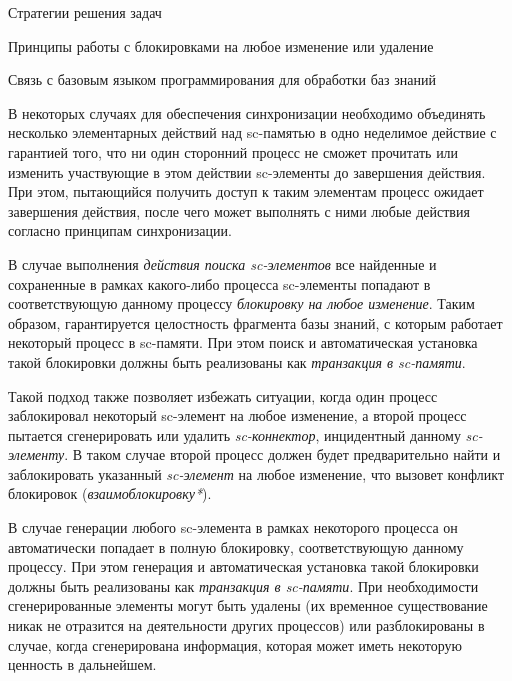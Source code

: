 \begin{frame}{Стратегии решения задач}
\begin{frame}{\large Принципы работы с блокировками на любое изменение или удаление}
\begin{frame}{Связь с базовым языком программирования для обработки баз
знаний}
\begin{frame}{}
В некоторых случаях для обеспечения синхронизации необходимо объединять несколько элементарных действий над sc-памятью в одно неделимое действие с гарантией того, что ни один сторонний процесс не сможет прочитать или изменить участвующие в этом действии sc-элементы до завершения действия. При этом, пытающийся получить доступ к таким элементам процесс ожидает завершения действия, после чего может выполнять с ними любые действия согласно принципам синхронизации.

В случае выполнения \textit{действия поиска sc-элементов} все найденные и сохраненные в рамках какого-либо процесса sc-элементы попадают в соответствующую данному процессу \textit{блокировку на любое изменение}. Таким образом, гарантируется целостность фрагмента базы знаний, с которым работает некоторый процесс в sc-памяти. При этом поиск и автоматическая установка такой блокировки должны быть реализованы как \textit{транзакция в sc-памяти}.
	
\end{frame}

\begin{frame}{}
Такой подход также позволяет избежать ситуации, когда один процесс заблокировал некоторый sc-элемент на любое изменение, а второй процесс пытается сгенерировать или удалить \textit{sc-коннектор}, инцидентный данному \textit{sc-элементу}. В таком случае второй процесс должен будет предварительно найти и заблокировать указанный \textit{sc-элемент} на любое изменение, что вызовет конфликт блокировок (\textit{взаимоблокировку*}).

В случае генерации любого sc-элемента в рамках некоторого процесса он автоматически попадает в полную блокировку, соответствующую данному процессу. При этом генерация и автоматическая установка такой блокировки должны быть реализованы как \textit{транзакция в sc-памяти}. При необходимости сгенерированные элементы могут быть удалены (их временное существование никак не отразится на деятельности других процессов) или разблокированы в случае, когда сгенерирована информация, которая может иметь некоторую ценность в дальнейшем.
\end{frame}


\end{frame}
\end{frame}
\end{frame}
